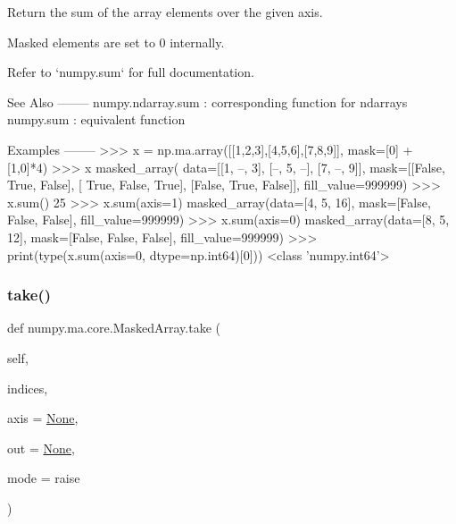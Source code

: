 \begin{DoxyVerb}Return the sum of the array elements over the given axis.

Masked elements are set to 0 internally.

Refer to `numpy.sum` for full documentation.

See Also
--------
numpy.ndarray.sum : corresponding function for ndarrays
numpy.sum : equivalent function

Examples
--------
>>> x = np.ma.array([[1,2,3],[4,5,6],[7,8,9]], mask=[0] + [1,0]*4)
>>> x
masked_array(
  data=[[1, --, 3],
[--, 5, --],
[7, --, 9]],
  mask=[[False,  True, False],
[ True, False,  True],
[False,  True, False]],
  fill_value=999999)
>>> x.sum()
25
>>> x.sum(axis=1)
masked_array(data=[4, 5, 16],
     mask=[False, False, False],
       fill_value=999999)
>>> x.sum(axis=0)
masked_array(data=[8, 5, 12],
     mask=[False, False, False],
       fill_value=999999)
>>> print(type(x.sum(axis=0, dtype=np.int64)[0]))
<class 'numpy.int64'>\end{DoxyVerb}
 \mbox{\label{classnumpy_1_1ma_1_1core_1_1MaskedArray_ac47b0b42e9c8d2fc1876e08131fb29bc}} 
\subsubsection{\texorpdfstring{take()}{take()}}
{\footnotesize\ttfamily def numpy.\+ma.\+core.\+Masked\+Array.\+take (\begin{DoxyParamCaption}\item[{}]{self,  }\item[{}]{indices,  }\item[{}]{axis = {\ttfamily \hyperlink{namespacenumpy_1_1ma_1_1core_a647ee1848dfa3692fe35a663a2aa40b3}{None}},  }\item[{}]{out = {\ttfamily \hyperlink{namespacenumpy_1_1ma_1_1core_a647ee1848dfa3692fe35a663a2aa40b3}{None}},  }\item[{}]{mode = {\ttfamily \textquotesingle{}raise\textquotesingle{}} }\end{DoxyParamCaption})}

\begin{DoxyVerb}\end{DoxyVerb}
 \mbox{\label{classnumpy_1_1ma_1_1core_1_1MaskedArray_a573ceaaba707d62c5f1664105e30c59c}} 
